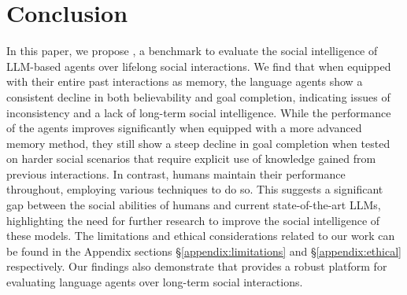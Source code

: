 \section{Conclusion}

In this paper, we propose \lifelongsotopia, a benchmark to evaluate the social intelligence of LLM-based agents over lifelong social interactions. We find that when equipped with their entire past interactions as memory, the language agents show a consistent decline in both believability and goal completion, indicating issues of inconsistency and a lack of long-term social intelligence. While the performance of the agents improves significantly when equipped with a more advanced memory method, they still show a steep decline in goal completion when tested on harder social scenarios that require explicit use of knowledge gained from previous interactions. In contrast, humans maintain their performance throughout, employing various techniques to do so. This suggests a significant gap between the social abilities of humans and current state-of-the-art LLMs, highlighting the need for further research to improve the social intelligence of these models. The limitations and ethical considerations related to our work can be found in the Appendix sections \S \ref{appendix:limitations} and \S \ref{appendix:ethical} respectively. Our findings also demonstrate that \lifelongsotopia provides a robust platform for evaluating language agents over long-term social interactions.